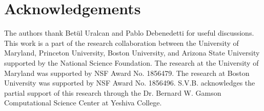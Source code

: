 \documentclass[5p,twocolumn]{elsarticle}
\newcommand{\red}[1]{\textcolor{red}{#1}}
\begin{document}
\section*{Acknowledgements}
The authors thank Bet\"ul Uralcan and Pablo Debenedetti for useful discussions. This work is a part of the research collaboration between the University of Maryland, Princeton University, Boston University, and Arizona State University supported by the National Science Foundation. The research at the University of Maryland was supported by NSF Award No. 1856479. The research at Boston University was supported by NSF Award No. 1856496. S.V.B. acknowledges the partial support of this research through the Dr. Bernard W. Gamson Computational Science Center at Yeshiva College.



\end{document}
